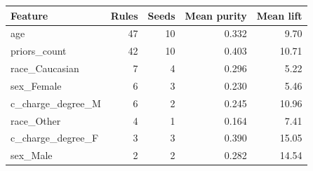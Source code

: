 \begin{tabular}{lrrrr}
\hline
Feature & Rules & Seeds & Mean purity & Mean lift \\
\hline
age & 47 & 10 & 0.332 & 9.70 \\
priors\_count & 42 & 10 & 0.403 & 10.71 \\
race\_Caucasian & 7 & 4 & 0.296 & 5.22 \\
sex\_Female & 6 & 3 & 0.230 & 5.46 \\
c\_charge\_degree\_M & 6 & 2 & 0.245 & 10.96 \\
race\_Other & 4 & 1 & 0.164 & 7.41 \\
c\_charge\_degree\_F & 3 & 3 & 0.390 & 15.05 \\
sex\_Male & 2 & 2 & 0.282 & 14.54 \\
\hline
\end{tabular}